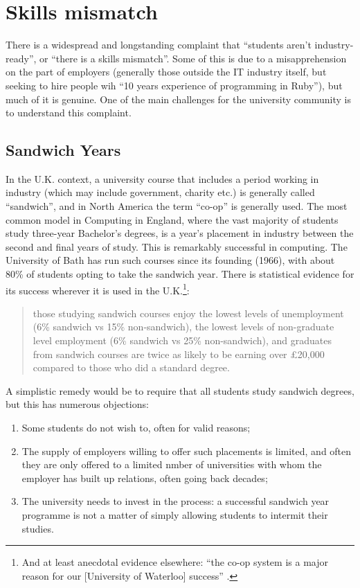 \documentclass[sigconf]{acmart}
\begin{document}
\section{Skills mismatch}

There is a widespread and longstanding complaint that ``students
aren't industry-ready'', or ``there is a skills mismatch''. Some of
this is due to a misapprehension on the part of employers (generally
those outside the IT industry itself, but seeking to hire people wih
``10 years experience of programming in Ruby''), but much of it is
genuine. One of the main challenges for the university community is to
understand this complaint.

\subsection{Sandwich Years}

In the U.K. context, a university course that includes a period
working in industry (which may include government, charity etc.) is
generally called ``sandwich'', and in North America the term ``co-op''
is generally used. The most common model in Computing in England,
where the vast majority of students study three-year Bachelor's
degrees, is a year's placement in industry between the second and
final years of study. This is remarkably successful in computing. The
University of Bath has run such courses since its founding (1966),
with about 80\% of students opting to take the sandwich year. There is
statistical evidence for its success wherever it is used in the
U.K.\footnote{And at least anecdotal evidence elsewhere: ``the co-op
system is a major reason for our [University of Waterloo] success''
\cite{Watt2017a}.}:

\begin{quote} those studying sandwich courses enjoy the lowest levels
of unemployment (6\% sandwich vs 15\% non-sandwich), the lowest levels
of non-graduate level employment (6\% sandwich vs 25\% non-sandwich),
and graduates from sandwich courses are twice as likely to be earning
over \pounds20,000 compared to those who did a standard
degree. \cite[\P2.5]{Shadbolt2016a}
\end{quote}

A simplistic remedy would be to require that all students study
sandwich degrees, but this has numerous objections:

\begin{enumerate}
\item Some students do not wish to, often for valid reasons;
\item The supply of employers willing to offer such placements is
limited, and often they are only offered to a limited nmber of
universities with whom the employer has built up relations, often
going back decades;
\item The university needs to invest in the process: a successful
sandwich year programme is not a matter of simply allowing students to
intermit their studies.
\end{enumerate}
\end{document}
